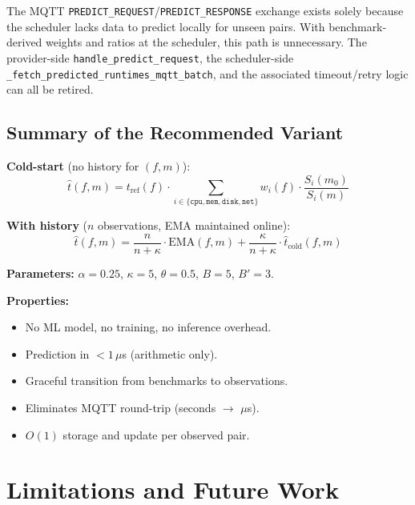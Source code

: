 \documentclass[11pt, a4paper]{article}
\newcommand{\bluecontentbegin}{\begingroup\color{blue!70!black}}
\newcommand{\bluecontentend}{\endgroup}
\begin{document}
The MQTT \texttt{PREDICT\_REQUEST}/\texttt{PREDICT\_RESPONSE}
exchange exists solely because the scheduler lacks data to predict
locally for unseen pairs. With benchmark-derived weights and ratios
at the scheduler, this path is unnecessary. The provider-side
\texttt{handle\_predict\_request}, the scheduler-side
\texttt{\_fetch\_predicted\_runtimes\_mqtt\_batch}, and the
associated timeout/retry logic can all be retired.

\subsection{Summary of the Recommended Variant}

\begin{tcolorbox}[colback=blue!3, colframe=blue!50!black,
    title=Final Recommended Prediction Model]

\textbf{Cold-start} (no history for $(f, m)$):
\[
    \hat{t}(f, m) = t_{\mathrm{ref}}(f) \cdot
    \sum_{i \in \{\texttt{cpu}, \texttt{mem}, \texttt{disk},
    \texttt{net}\}}
    w_i(f) \cdot \frac{S_i(m_0)}{S_i(m)}
\]

\textbf{With history} ($n$ observations, EMA maintained online):
\[
    \hat{t}(f, m) = \frac{n}{n + \kappa} \cdot \mathrm{EMA}(f, m)
    + \frac{\kappa}{n + \kappa} \cdot \hat{t}_{\mathrm{cold}}(f, m)
\]

\textbf{Parameters:} $\alpha = 0.25$, $\kappa = 5$, $\theta = 0.5$,
$B = 5$, $B' = 3$.

\medskip

\textbf{Properties:}
\begin{itemize}[nosep]
    \item No ML model, no training, no inference overhead.
    \item Prediction in $< 1\,\mu$s (arithmetic only).
    \item Graceful transition from benchmarks to observations.
    \item Eliminates MQTT round-trip (seconds $\to$ $\mu$s).
    \item $O(1)$ storage and update per observed pair.
\end{itemize}
\end{tcolorbox}
\bluecontentend

\section{Limitations and Future Work}
\bluecontentbegin
\end{document}
